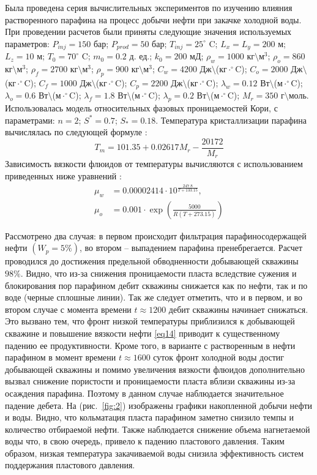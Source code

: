 \documentclass[12pt,twoside,a4paper]{uz_ku}
\begin{document}
	Была проведена серия вычислительных экспериментов по изучению влияния растворенного парафина на процесс добычи нефти при закачке холодной воды. При проведении расчетов были приняты следующие значения используемых параметров: $P_{inj}=150$ бар; $P_{prod}=50$ бар; $T_{inj}=25 ^\circ$ C; $L_x=L_y=200$ м; $L_z=10$ м; $T_0=70 ^\circ$ C; $m_0=0.2$ д. ед.; $k_0=200$ мД; $\rho_w=1000$ кг$\setminus$м$^3$; $\rho_o=860$ кг$\setminus$м$^3$; $\rho_f=2700$ кг$\setminus$м$^3$; $\rho_p=900$ кг$\setminus$м$^3$; $C_w=4200$ Дж$\setminus$(кг$\cdot^\circ$C); $C_o=2000$ Дж$\setminus$(кг$\cdot^\circ$C); $C_f=1000$ Дж$\setminus$(кг$\cdot^\circ$C); $C_p=2200$ Дж$\setminus$(кг$\cdot^\circ$C); $\lambda_w=0.12$ Вт$\setminus$(м$\cdot^\circ$C); $\lambda_o=0.6$ Вт$\setminus$(м$\cdot^\circ$C); $\lambda_f=1.8$ Вт$\setminus$(м$\cdot^\circ$C); $\lambda_p=0.2$ Вт$\setminus$(м$\cdot^\circ$C); $M_r=350$ г$\setminus$моль. Использовалась модель относительных фазовых проницаемостей Кори, с параметрами: $n=2$; $S^*=0.7$; $S_*=0.18$. Температура кристаллизации парафина вычислялась по следующей формуле \cite{14}: 
\begin{equation}\label{eq13}
	T_m = 101.35 + 0.02617 M_r - \frac{20172}{M_r}
\end{equation}
Зависимость вязкости флюидов от температуры вычисляются с использованием приведенных ниже уравнений \cite{15}: 
\begin{equation}\label{eq14}
\begin{split}
    \mu_w &= 0.00002414 \cdot 10^{\frac{247.8}{T + 133.15}}, \\
    \mu_o &= 0.001 \cdot \exp\left(\frac{5000}{R (T + 273.15)}\right)
\end{split}
\end{equation}

	Рассмотрено два случая: в первом происходит фильтрация парафиносодержащей нефти $(W_p=5\%)$, во втором – выпадением парафина пренебрегается. Расчет проводился до достижения предельной обводненности добывающей скважины $98 \%$. Видно, что из-за снижения проницаемости пласта вследствие сужения и блокирования пор парафином дебит скважины снижается как по нефти, так и по воде (черные сплошные линии). Так же следует отметить, что и в первом, и во втором случае с момента времени $t\approx 1200$ дебит скважины начинает снижаться. Это вызвано тем, что фронт низкой температуры приблизился к добывающей скважине и повышение вязкости нефти \eqref{eq14} приводит к существенному падению ее продуктивности. Кроме того, в варианте с растворенным в нефти парафином в момент времени $t\approx 1600$ суток фронт холодной воды достиг добывающей скважины и помимо увеличения вязкости флюидов дополнительно вызвал снижение пористости и проницаемости пласта вблизи скважины из-за осаждения парафина. Поэтому в данном случае наблюдается значительное падение дебета. На (рис.~\ref{fig:2}) изображены графики накопленной добычи нефти и воды. Видно, что кольматация пласта парафином заметно снизило темпы и количество отбираемой нефти. Также наблюдается снижение объема нагнетаемой воды что, в свою очередь, привело к падению пластового давления. Таким образом, низкая температура закачиваемой воды снизила эффективность систем поддержания пластового давления.
	
\end{document}
